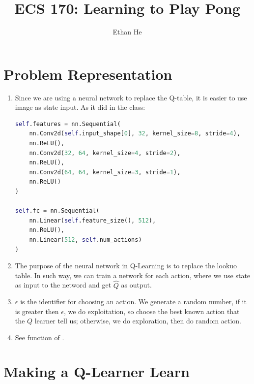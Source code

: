 \documentclass[12pt]{article}
\title{ECS 170: Learning to Play Pong}
\author{Ethan He}
\date{\vspace{-1cm}}
\newcommand{\1}{\mathds{1}}
\newcommand{\<}{\langle}
\renewcommand{\>}{\rangle}
\begin{document}
\maketitle

\section{Problem Representation}

\begin{enumerate}
    \item Since we are using a neural network to replace the Q-table,
        it is easier to use image as state input.
        As it did in the  class:
\begin{lstlisting}[language=Python]
self.features = nn.Sequential(
    nn.Conv2d(self.input_shape[0], 32, kernel_size=8, stride=4),
    nn.ReLU(),
    nn.Conv2d(32, 64, kernel_size=4, stride=2),
    nn.ReLU(),
    nn.Conv2d(64, 64, kernel_size=3, stride=1),
    nn.ReLU()
)

self.fc = nn.Sequential(
    nn.Linear(self.feature_size(), 512),
    nn.ReLU(),
    nn.Linear(512, self.num_actions)
)
\end{lstlisting}

    \item The purpose of the neural network in Q-Learning is to replace the lookuo table.
        In such way, we can train a network for each action,
        where we use state as input to the netword and get $\widehat{Q}$ as output.

    \item $\epsilon$ is the identifier for choosing an action.
        We generate a random number,
        if it is greater then $\epsilon$,
        we do exploitation, so choose the best known action that the $Q$ learner tell us;
        otherwise, we do exploration, then do random action.

    \item See function  of .
\end{enumerate}



\section{Making a Q-Learner Learn}
\end{document}
